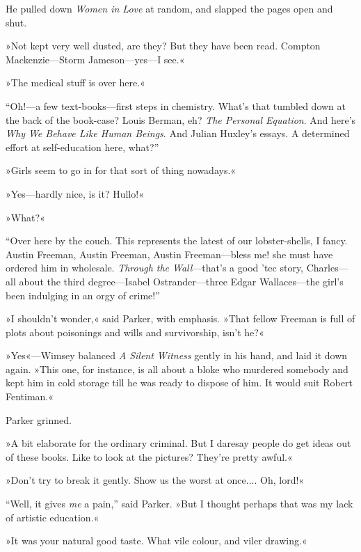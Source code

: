 He pulled down \textit{Women in Love} at random, and slapped the pages open and shut.

»Not kept very well dusted, are they? But they have been read. Compton Mackenzie\allowbreak---\allowbreak Storm Jameson\allowbreak---\allowbreak yes---I see.«

»The medical stuff is over here.«

\enquote{Oh!---a few text-books\allowbreak---\allowbreak first steps in chemistry. What's that tumbled down at the back of the book-case? Louis Berman, eh? \textit{The Personal Equation}. And here's \textit{Why We Behave Like Human Beings}. And Julian Huxley's essays. A determined effort at self-education here, what?}

»Girls seem to go in for that sort of thing nowadays.«

»Yes\allowbreak---\allowbreak hardly nice, is it? Hullo!«

»What?«

\enquote{Over here by the couch. This represents the latest of our lobster-shells, I fancy. Austin Freeman, Austin Freeman, Austin Freeman\allowbreak---\allowbreak bless me! she must have ordered him in wholesale. \textit{Through the Wall}---that's a good 'tec story, Charles\allowbreak---\allowbreak all about the third degree\allowbreak---\allowbreak Isabel Ostrander\allowbreak---\allowbreak three Edgar Wallaces\allowbreak---\allowbreak the girl's been indulging in an orgy of crime!}

»I shouldn't wonder,« said Parker, with emphasis. »That fellow Freeman is full of plots about poisonings and wills and survivorship, isn't he?«

»Yes«---Wimsey balanced \textit{A Silent Witness} gently in his hand, and laid it down again. »This one, for instance, is all about a bloke who murdered somebody and kept him in cold storage till he was ready to dispose of him. It would suit Robert Fentiman.«

Parker grinned.

»A bit elaborate for the ordinary criminal. But I daresay people do get ideas out of these books. Like to look at the pictures? They're pretty awful.«

»Don't try to break it gently. Show us the worst at once.... Oh, lord!«

\enquote{Well, it gives \textit{me} a pain,} said Parker. »But I thought perhaps that was my lack of artistic education.«

»It was your natural good taste. What vile colour, and viler drawing.«

